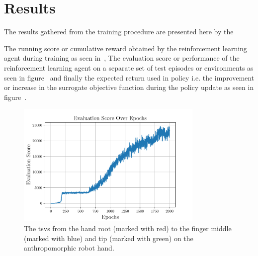 \section{Results}\label{3-in-hand-manipulation-results}
The results gathered from the training procedure are presented here by the 

The running score or cumulative reward obtained by the reinforcement learning agent during training as seen in~, The evaluation score or performance of the reinforcement learning agent on a separate set of test episodes or environments as seen in figure~ and finally the expected return used in policy i.e. the improvement or increase in the surrogate objective function during the policy update as seen in figure~.

\begin{figure}[!h]
	\begin{center}
		\includegraphics[width=0.8\textwidth]{chapters/3-in-hand-manipulation/fig/evaluation-score-over-epochs.pdf}
	\end{center}
	\caption{The \gls{tsv}s from the hand root (marked with red) to the finger middle (marked with blue) and tip (marked with green) on the anthropomorphic robot hand.}
	\label{fig:evaluation-score-over-epochs}
\end{figure}

